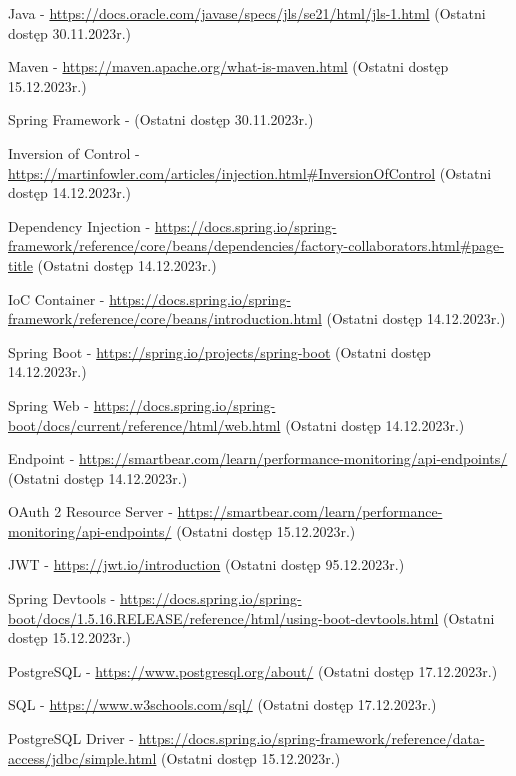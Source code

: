 \documentclass[11pt,a4paper]{article}
\begin{document}
\newpage
\begin{thebibliography}{9}

Java - \url{https://docs.oracle.com/javase/specs/jls/se21/html/jls-1.html} (Ostatni dostęp 30.11.2023r.)

Maven - \url{https://maven.apache.org/what-is-maven.html} (Ostatni dostęp 15.12.2023r.)

Spring Framework - \url{} (Ostatni dostęp 30.11.2023r.)

Inversion of Control - \url{https://martinfowler.com/articles/injection.html#InversionOfControl} (Ostatni dostęp 14.12.2023r.)

Dependency Injection - \url{https://docs.spring.io/spring-framework/reference/core/beans/dependencies/factory-collaborators.html#page-title} (Ostatni dostęp 14.12.2023r.)

IoC Container - \url{https://docs.spring.io/spring-framework/reference/core/beans/introduction.html} (Ostatni dostęp 14.12.2023r.)

Spring Boot - \url{https://spring.io/projects/spring-boot} (Ostatni dostęp 14.12.2023r.)

Spring Web - \url{https://docs.spring.io/spring-boot/docs/current/reference/html/web.html} (Ostatni dostęp 14.12.2023r.)

Endpoint - \url{https://smartbear.com/learn/performance-monitoring/api-endpoints/} (Ostatni dostęp 14.12.2023r.)

OAuth 2 Resource Server - \url{https://smartbear.com/learn/performance-monitoring/api-endpoints/} (Ostatni dostęp 15.12.2023r.)

JWT - \url{https://jwt.io/introduction} (Ostatni dostęp 95.12.2023r.)

Spring Devtools - \url{https://docs.spring.io/spring-boot/docs/1.5.16.RELEASE/reference/html/using-boot-devtools.html} (Ostatni dostęp 15.12.2023r.)

PostgreSQL - \url{https://www.postgresql.org/about/} (Ostatni dostęp 17.12.2023r.)

SQL - \url{https://www.w3schools.com/sql/} (Ostatni dostęp 17.12.2023r.)

PostgreSQL Driver - \url{https://docs.spring.io/spring-framework/reference/data-access/jdbc/simple.html} (Ostatni dostęp 15.12.2023r.)


\end{thebibliography}
\end{document}
